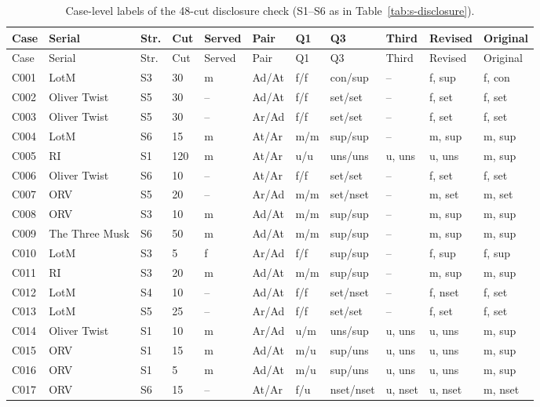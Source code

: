 \documentclass[11pt]{article}
\begin{document}
{\scriptsize\begin{longtable}{p{0.7cm}p{0.7cm}p{0.5cm}p{0.5cm}p{0.8cm}p{0.8cm}p{0.7cm}p{1.3cm}p{1.1cm}p{1.6cm}p{1.3cm}}
\caption{Case-level labels of the 48-cut disclosure check (S1--S6 as in Table~\ref{tab:s-disclosure}).}\label{tab:s-disclosure-labels}\\
\toprule Case & Serial & Str. & Cut & Served & Pair & Q1 & Q3 & Third & Revised & Original \\ \midrule \endfirsthead \toprule Case & Serial & Str. & Cut & Served & Pair & Q1 & Q3 & Third & Revised & Original \\ \midrule \endhead
C001 & LotM & S3 & 30 & m & Ad/At & f/f & con/sup & -- & f, sup & f, con \\
C002 & Oliver Twist & S5 & 30 & -- & Ad/At & f/f & set/set & -- & f, set & f, set \\
C003 & Oliver Twist & S5 & 30 & -- & Ar/Ad & f/f & set/set & -- & f, set & f, set \\
C004 & LotM & S6 & 15 & m & At/Ar & m/m & sup/sup & -- & m, sup & m, sup \\
C005 & RI & S1 & 120 & m & At/Ar & u/u & uns/uns & u, uns & u, uns & m, sup \\
C006 & Oliver Twist & S6 & 10 & -- & At/Ar & f/f & set/set & -- & f, set & f, set \\
C007 & ORV & S5 & 20 & -- & Ar/Ad & m/m & set/nset & -- & m, set & m, set \\
C008 & ORV & S3 & 10 & m & Ad/At & m/m & sup/sup & -- & m, sup & m, sup \\
C009 & The Three Musk & S6 & 50 & m & Ad/At & m/m & sup/sup & -- & m, sup & m, sup \\
C010 & LotM & S3 & 5 & f & Ar/Ad & f/f & sup/sup & -- & f, sup & f, sup \\
C011 & RI & S3 & 20 & m & Ad/At & m/m & sup/sup & -- & m, sup & m, sup \\
C012 & LotM & S4 & 10 & -- & Ad/At & f/f & set/nset & -- & f, nset & f, set \\
C013 & LotM & S5 & 25 & -- & Ar/Ad & f/f & set/set & -- & f, set & f, set \\
C014 & Oliver Twist & S1 & 10 & m & Ar/Ad & u/m & uns/sup & u, uns & u, uns & m, sup \\
C015 & ORV & S1 & 15 & m & Ad/At & m/u & sup/uns & u, uns & u, uns & m, sup \\
C016 & ORV & S1 & 5 & m & Ad/At & m/u & sup/uns & u, uns & u, uns & m, sup \\
C017 & ORV & S6 & 15 & -- & At/Ar & f/u & nset/nset & u, nset & u, nset & m, nset \\

\end{longtable}}
\end{document}
